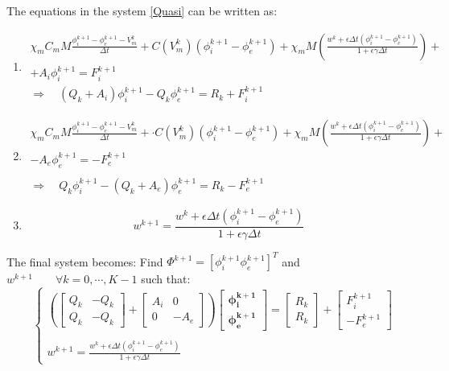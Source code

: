 \documentclass[a4paper,12pt]{article}
\begin{document}
The equations in the system \ref{Quasi} can be written as:
\begin{enumerate}
\item
\begin{equation*}
\begin{gathered}
\chi_m C_m M \frac{	\phi_i^{k+1}-\phi_e^{k+1}-V_m^{k}}{\Delta t} +  C(V_m^k) (\phi_i^{k+1}-\phi_e^{k+1}) + \chi_m M \left(\frac{w^k + \epsilon \Delta t (\phi_i^{k+1}-\phi_e^{k+1})}{1+\epsilon \gamma \Delta t}   \right)+\\
+ A_i \phi_i ^{k+1} = F_i^{k+1} \\
\Rightarrow \quad (Q_k + A_i) \phi_i^{k+1} - Q_k \phi_e^{k+1} =R_k +  F_i^{k+1}
\end{gathered}
\end{equation*}
\item
\begin{equation*}
\begin{gathered}
\chi_m C_m M \frac{	\phi_i^{k+1}-\phi_e^{k+1}-V_m^{k}}{\Delta t} + \cdot C(V_m^k) (\phi_i^{k+1}-\phi_e^{k+1}) + \chi_m M \left(\frac{w^k + \epsilon \Delta t (\phi_i^{k+1}-\phi_e^{k+1})}{1+\epsilon \gamma \Delta t}   \right) +\\
- A_e \phi_e ^{k+1} = -F_e^{k+1} \\ \\
\Rightarrow \quad Q_k \phi_i^{k+1} - (Q_k+A_e) \phi_e^{k+1} =R_k - F_e^{k+1}
\end{gathered}
\end{equation*}
\item 
\begin{equation*}
w^{k+1} = \frac{w^k + \epsilon \Delta t (\phi_i^{k+1}-\phi_e^{k+1})}{1+\epsilon \gamma \Delta t}
\end{equation*}
\end{enumerate}
The final system becomes:\newline
Find $\Phi^{k+1}=[\phi_i^{k+1} \phi_e^{k+1}]^T$ and $w^{k+1} \qquad \forall k=0, \cdots, K-1$ such that:
\begin{equation}
\quad
\begin{cases}
\left(
\begin{bmatrix} Q_k & -Q_k \\ Q_k & -Q_k \end{bmatrix} + 
\begin{bmatrix} A_i & 0 \\ 0 & -A_e\end{bmatrix}
\right)
\begin{bmatrix}
\bm{\phi_i^{k+1}} \\ \bm{\phi_e^{k+1}}
\end{bmatrix}
= \begin{bmatrix} R_k \\ R_k \end{bmatrix} + \begin{bmatrix} F_i^{k+1} \\  -F_e^{k+1}\end{bmatrix} \\ \\
w^{k+1} = \frac{\displaystyle w^k + \epsilon \Delta t (\phi_i^{k+1}-\phi_e^{k+1})}{\displaystyle 1+\epsilon \gamma \Delta t}
\end{cases}
\end{equation}
\end{document}
